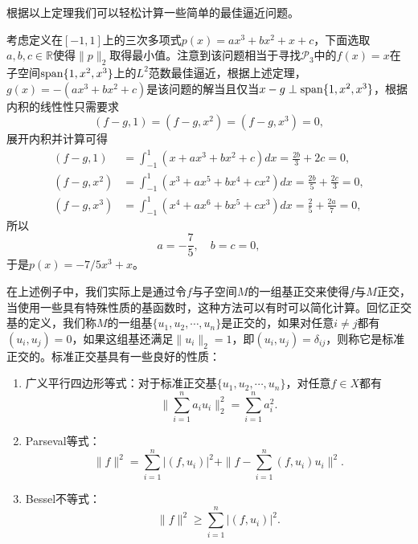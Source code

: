 \documentclass[a4paper,10pt]{ctexart}
\begin{document}
根据以上定理我们可以轻松计算一些简单的最佳逼近问题。
\begin{example}
    考虑定义在$ [-1,1] $上的三次多项式$ p(x) = ax^3+bx^2+x+c $，下面选取$ a,b,c\in \mathbb{R} $使得$ \| p \|_2 $取得最小值。注意到该问题相当于寻找$ \mathcal{P}_3 $中的$ f(x)=x $在子空间$ {\rm span}\{1,x^2,x^3\} $上的$ L^2 $范数最佳逼近，根据上述定理，$ g(x)=-(ax^3+bx^2+c) $是该问题的解当且仅当$ x-g\perp {\rm span}\{1,x^2,x^3\} $，根据内积的线性性只需要求
    \[
        (f-g,1) = (f-g,x^2) = (f-g,x^3) = 0,
    \]
    展开内积并计算可得
    \[
        \begin{aligned}
            (f-g,1) &= \int_{-1}^{1} (x+ax^3+bx^2+c)dx = \frac{2b}{3}+2c=0,\\
            (f-g,x^2) &= \int_{-1}^{1} (x^3+ax^5+bx^4+cx^2)dx = \frac{2b}{5}+\frac{2c}{3} = 0,\\
            (f-g,x^3) &= \int_{-1}^{1} (x^4+ax^6+bx^5+cx^3)dx = \frac{2}{5}+\frac{2a}{7} = 0,
        \end{aligned}
    \]
    所以
    \[
        a = -\frac{7}{5}, \quad b=c=0,
    \]
    于是$ p(x) = -7 / 5 x^3+x $。
\end{example}

在上述例子中，我们实际上是通过令$ f $与子空间$ M $的一组基正交来使得$ f $与$ M $正交，当使用一些具有特殊性质的基函数时，这种方法可以有时可以简化计算。回忆正交基的定义，我们称$ M $的一组基$ \{u_1,u_2,\cdots ,u_n\} $是正交的，如果对任意$ i\ne j $都有$ (u_i,u_j) = 0 $，如果这组基还满足$ \| u_i \|_2 = 1 $，即$ (u_i,u_j)=\delta_{ij} $，则称它是标准正交的。标准正交基具有一些良好的性质：
\begin{enumerate}
    \item 广义平行四边形等式：对于标准正交基$ \{u_1,u_2,\cdots ,u_n\} $，对任意$ f\in X $都有
    \begin{equation}
        \| \sum_{i=1}^n a_i u_i \|_2^2 = \sum_{i=1}^n a_i^2.
    \end{equation}
    \item Parseval等式：
    \begin{equation}
        \| f \|^2 = \sum_{i=1}^n |(f,u_i)|^2 + \| f - \sum_{i=1}^n (f,u_i)u_i \|^2.
    \end{equation}
    \item Bessel不等式：
    \begin{equation}
        \| f \|^2 \geqslant \sum_{i=1}^n |(f,u_i)|^2.
    \end{equation}
\end{enumerate}
\end{document}
